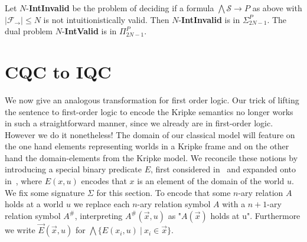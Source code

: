 \documentclass[a4paper,UKenglish,cleveref, autoref, thm-restate]{lipics-v2021}
\begin{document}
\begin{corollary}
	Let $N$-\textbf{IntInvalid} be the problem of deciding if a formula $\bigwedge \mathcal S\to P$ as above with $|\mathcal F_\to|\leq N$ is not intuitionistically valid. Then $N$-\textbf{IntInvalid} is in $\Sigma_{2N-1}^P$. The dual problem $N$-\textbf{IntValid} is in $\Pi_{2N-1}^P$.
\end{corollary}


\section{CQC to IQC}

We now give an analogous transformation for first order logic. Our trick of lifting the sentence to first-order logic to encode the Kripke semantics no longer works in such a straightforward manner, since we already are in first-order logic. However we do it nonetheless! The domain of our classical model will feature on the one hand elements representing worlds in a Kripke frame and on the other hand the domain-elements from the Kripke model. We reconcile these notions by introducing a special binary predicate $E$, first considered in~\cite{baaz2006skolemization} and expanded onto in~\cite{iemhoff2010eskolemization}, where $E(x, u)$ encodes that $x$ is an element of the domain of the world $u$. We fix some signature $\Sigma$ for this section. To encode that some $n$-ary relation $A$ holds at a world $u$ we replace each $n$-ary relation symbol $A$ with a $n+1$-ary relation symbol $A^\#$, interpreting $A^\#(\vec x, u)$ as "$A(\vec x)$ holds at u". Furthermore we write $\vec E(\vec x, u)$ for $\bigwedge\{E(x_i, u)\:|\:x_i\in \vec x\}$.
\end{document}
